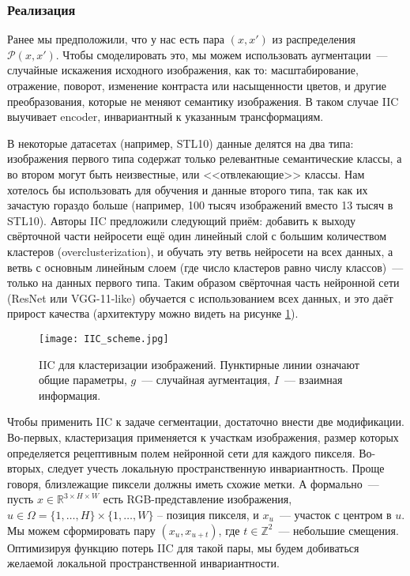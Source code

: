     \subsubsection{Реализация}
    Ранее мы предположили, что у нас есть пара $(x, x')$ из распределения $\mathcal{P}(x, x')$.
    Чтобы смоделировать это, мы можем использовать аугментации~--- случайные искажения исходного изображения,
    как то: масштабирование, отражение, поворот, изменение контраста или насыщенности цветов, и другие преобразования, которые не меняют семантику изображения. 
    В таком случае IIC выучивает encoder, инвариантный к указанным трансформациям.

    В некоторые датасетах (например, STL10) данные делятся на два типа: изображения первого типа содержат только релевантные семантические классы,
    а во втором могут быть неизвестные, или <<отвлекающие>> классы.
    Нам хотелось бы использовать для обучения и данные второго типа, так как их зачастую гораздо больше (например, 100 тысяч изображений вместо 13 тысяч в STL10).
    Авторы IIC предложили следующий приём: добавить к выходу свёрточной части нейросети ещё один линейный слой с большим количеством кластеров (overclusterization), 
    и обучать эту ветвь нейросети на всех данных, а ветвь с основным линейным слоем (где число кластеров равно числу классов)~--- только на данных первого типа.
    Таким образом свёрточная часть нейронной сети (ResNet или VGG-11-like) обучается с использованием всех данных, 
    и это даёт прирост качества (архитектуру можно видеть на рисунке \ref{fig:iic_scheme}).

    \begin{figure}
        \centering
        \texttt{[image: IIC\_scheme.jpg]}
        \caption{IIC для кластеризации изображений. 
        Пунктирные линии означают общие параметры, $g$~--- случайная аугментация, 
        $I$~--- взаимная информация.\label{fig:iic_scheme}}
    \end{figure}

    Чтобы применить IIC к задаче сегментации, достаточно внести две модификации.
    Во-первых, кластеризация применяется к участкам изображения, размер которых определяется рецептивным полем нейронной сети для каждого пикселя.
    Во-вторых, следует учесть локальную пространственную инвариантность.
    Проще говоря, близлежащие пиксели должны иметь схожие метки.
    А формально~--- пусть $x \in \mathbb{R}^{3 \times H \times W}$ есть RGB-представление изображения,
    $u \in \Omega = \{1, \ldots, H\} \times \{1, \ldots, W\}$ -- позиция пикселя, и $x_u$~--- участок с центром в $u$.
    Мы можем сформировать пару $(x_u, x_{u + t})$, где $t \in \mathbb{Z}^2$~--- небольшие смещения.
    Оптимизируя функцию потерь IIC для такой пары, мы будем добиваться желаемой локальной пространственной инвариантности.
    
